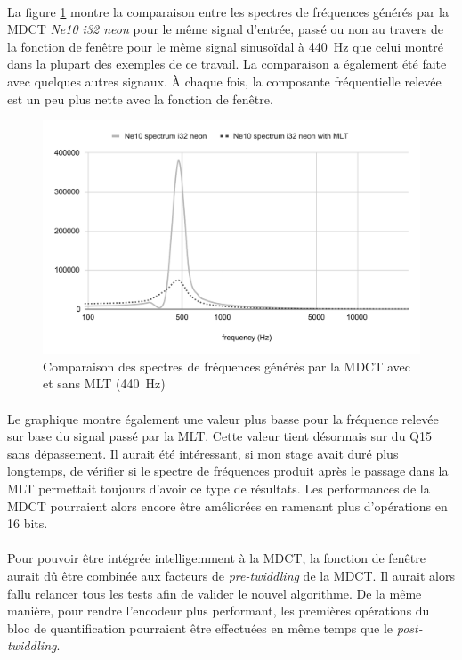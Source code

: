 \documentclass{article}
\begin{document}
    \paragraph{}
    La figure \ref{fig:spectre_mlt} montre la comparaison entre les spectres de fréquences générés par la MDCT \emph{Ne10 i32 neon} pour le même signal d'entrée, passé ou non au travers de la fonction de fenêtre pour le même signal sinusoïdal à \SI{440}{\hertz} que celui montré dans la plupart des exemples de ce travail. La comparaison a également été faite avec quelques autres signaux. À chaque fois, la composante fréquentielle relevée est un peu plus nette avec la fonction de fenêtre.
    \begin{figure}[H]
        \centering
        \includegraphics[width=.8\linewidth]{./images/validation_ne10_i32_neon_mlt.pdf}
        \caption{Comparaison des spectres de fréquences générés par la MDCT avec et sans MLT (\SI{440}{\hertz})}
        \label{fig:spectre_mlt}
    \end{figure}

    \paragraph{}
    Le graphique montre également une valeur plus basse pour la fréquence relevée sur base du signal passé par la MLT. Cette valeur tient désormais sur du Q15 sans dépassement. Il aurait été intéressant, si mon stage avait duré plus longtemps, de vérifier si le spectre de fréquences produit après le passage dans la MLT permettait toujours d'avoir ce type de résultats. Les performances de la MDCT pourraient alors encore être améliorées en ramenant plus d'opérations en 16 bits.

    \paragraph{}
    Pour pouvoir être intégrée intelligemment à la MDCT, la fonction de fenêtre aurait dû être combinée aux facteurs de \emph{pre-twiddling} de la MDCT. Il aurait alors fallu relancer tous les tests afin de valider le nouvel algorithme. De la même manière, pour rendre l'encodeur plus performant, les premières opérations du bloc de quantification pourraient être effectuées en même temps que le \emph{post-twiddling}.
\end{document}
